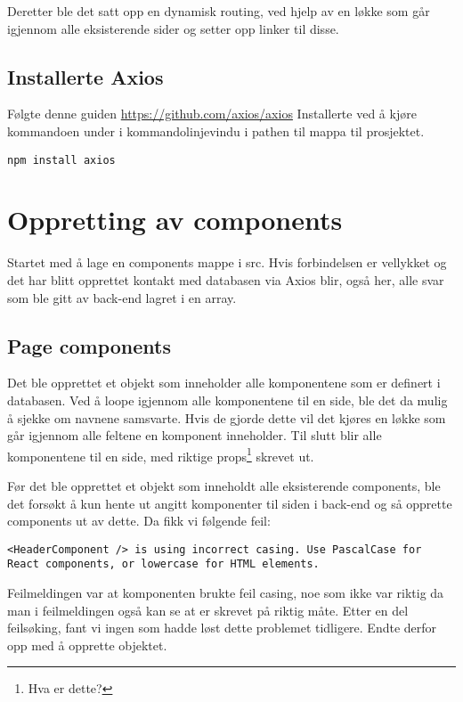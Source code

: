 Deretter ble det satt opp en dynamisk routing, ved hjelp av en løkke som går igjennom alle eksisterende sider og setter opp linker til disse.

\subsection{Installerte Axios}
Følgte denne guiden
\url{https://github.com/axios/axios}
Installerte ved å kjøre kommandoen under i kommandolinjevindu i pathen til mappa til prosjektet.
\begin{lstlisting}
npm install axios
\end{lstlisting}


\section{Oppretting av components}
Startet med å lage en components mappe i src. Hvis forbindelsen er vellykket og det har blitt opprettet kontakt med databasen via Axios blir, også her, alle svar som ble gitt av back-end lagret i en array. 

\subsection{Page components}

Det ble opprettet et objekt som inneholder alle komponentene som er definert i databasen. Ved å loope igjennom alle komponentene til en side, ble det da mulig å sjekke om navnene samsvarte. Hvis de gjorde dette vil det kjøres en løkke som går igjennom alle feltene en komponent inneholder. Til slutt blir alle komponentene til en side, med riktige props\footnote{Hva er dette?} skrevet ut.  

Før det ble opprettet et objekt som inneholdt alle eksisterende components, ble det forsøkt å kun hente ut angitt komponenter til siden i back-end og så opprette components ut av dette. Da fikk vi følgende feil:
\begin{lstlisting}
<HeaderComponent /> is using incorrect casing. Use PascalCase for React components, or lowercase for HTML elements.
\end{lstlisting}

Feilmeldingen var at komponenten brukte feil casing, noe som ikke var riktig da man i feilmeldingen også kan se at  er skrevet på riktig måte. Etter en del feilsøking, fant vi ingen som hadde løst dette problemet tidligere. Endte derfor opp med å opprette objektet. 

